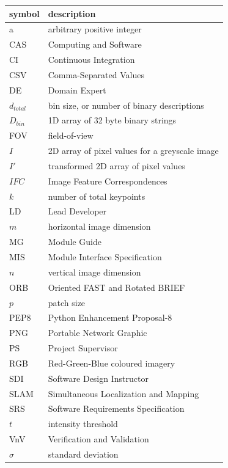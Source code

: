 \documentclass[12pt, titlepage]{article}
\begin{document}
\renewcommand{\arraystretch}{1.2}
\begin{tabular}{l l} 
  \toprule		
  \textbf{symbol} & \textbf{description}\\
  \midrule
  a & arbitrary positive integer\\
  CAS & Computing and Software\\
  CI & Continuous Integration\\
  CSV & Comma-Separated Values\\
  DE & Domain Expert \\
  $d_{total}$ & bin size, or number of binary descriptions \\
  $D_{bin}$ & 1D array of 32 byte binary strings \\
  FOV & field-of-view\\
  $I$ & 2D array of pixel values for a greyscale image \\
  $I'$ & transformed 2D array of pixel values\\
  $IFC$ & Image Feature Correspondences\\
  $k$ & number of total keypoints\\
  LD & Lead Developer \\
  $m$ & horizontal image dimension\\
  MG & Module Guide \\
  MIS & Module Interface Specification\\
  $n$ & vertical image dimension\\
  ORB & Oriented FAST and Rotated BRIEF\\
  $p$ & patch size\\
  PEP8 & Python Enhancement Proposal-8\\
  PNG & Portable Network Graphic\\
  PS & Project Supervisor\\
  RGB & Red-Green-Blue coloured imagery\\
  SDI & Software Design Instructor\\
  SLAM & Simultaneous Localization and Mapping\\
  SRS & Software Requirements Specification\\
  $t$ & intensity threshold \\
  VnV & Verification and Validation\\
  $\sigma$ & standard deviation\\
  \bottomrule
\end{tabular}\\

\newpage
\end{document}
